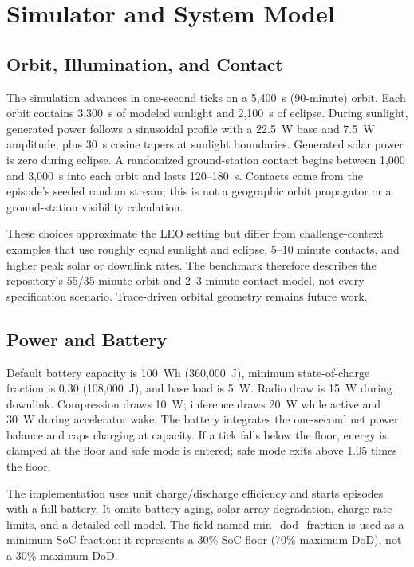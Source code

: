 \documentclass[11pt,letterpaper]{article}
\begin{document}
\section{Simulator and System Model}
\subsection{Orbit, Illumination, and Contact}
The simulation advances in one-second ticks on a 5,400~s (90-minute) orbit. Each orbit contains 3,300~s of modeled sunlight and 2,100~s of eclipse. During sunlight, generated power follows a sinusoidal profile with a 22.5~W base and 7.5~W amplitude, plus 30~s cosine tapers at sunlight boundaries. Generated solar power is zero during eclipse. A randomized ground-station contact begins between 1,000 and 3,000~s into each orbit and lasts 120--180~s. Contacts come from the episode's seeded random stream; this is not a geographic orbit propagator or a ground-station visibility calculation.

These choices approximate the LEO setting but differ from challenge-context examples that use roughly equal sunlight and eclipse, 5--10 minute contacts, and higher peak solar or downlink rates. The benchmark therefore describes the repository's 55/35-minute orbit and 2--3-minute contact model, not every specification scenario. Trace-driven orbital geometry remains future work.

\subsection{Power and Battery}
Default battery capacity is 100~Wh (360,000~J), minimum state-of-charge fraction is 0.30 (108,000~J), and base load is 5~W. Radio draw is 15~W during downlink. Compression draws 10~W; inference draws 20~W while active and 30~W during accelerator wake. The battery integrates the one-second net power balance and caps charging at capacity. If a tick falls below the floor, energy is clamped at the floor and safe mode is entered; safe mode exits above 1.05 times the floor.

The implementation uses unit charge/discharge efficiency and starts episodes with a full battery. It omits battery aging, solar-array degradation, charge-rate limits, and a detailed cell model. The field named \textrm{min\_dod\_fraction} is used as a minimum SoC fraction: it represents a 30\% SoC floor (70\% maximum DoD), not a 30\% maximum DoD.
\end{document}
